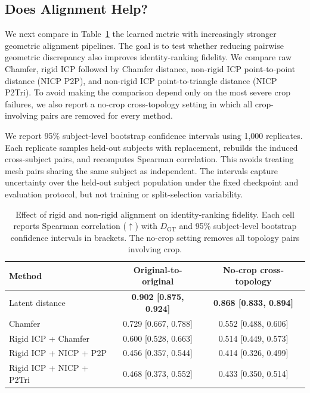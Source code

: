 \documentclass{article}
\begin{document}
\subsection{Does Alignment Help?}
\label{sec:alignment_results}

We next compare in Table~\ref{tab:alignment_effect} the learned metric with increasingly stronger geometric alignment pipelines. The goal is to test whether reducing pairwise geometric discrepancy also improves identity-ranking fidelity. We compare raw Chamfer, rigid ICP followed by Chamfer distance, non-rigid ICP point-to-point distance (NICP P2P), and non-rigid ICP point-to-triangle distance (NICP P2Tri). To avoid making the comparison depend only on the most severe crop failures, we also report a no-crop cross-topology setting in which all crop-involving pairs are removed for every method.

We report 95\% subject-level bootstrap confidence intervals using 1,000
replicates. Each replicate samples held-out subjects with replacement, rebuilds
the induced cross-subject pairs, and recomputes Spearman correlation. This avoids
treating mesh pairs sharing the same subject as independent. The intervals
capture uncertainty over the held-out subject population under the fixed
checkpoint and evaluation protocol, but not training or split-selection
variability.

\begin{table}[!ht]
\centering
\small
\caption{Effect of rigid and non-rigid alignment on identity-ranking fidelity.
Each cell reports Spearman correlation ($\uparrow$) with $D_{\mathrm{GT}}$ and
95\% subject-level bootstrap confidence intervals in brackets. The no-crop
setting removes all topology pairs involving crop.}
\label{tab:alignment_effect}
\begin{tabular}{lcc}
\toprule
Method & Original-to-original & No-crop cross-topology \\
\midrule
Latent distance & \textbf{0.902 [0.875, 0.924]} & \textbf{0.868 [0.833, 0.894]} \\
Chamfer & 0.729 [0.667, 0.788] & 0.552 [0.488, 0.606] \\
Rigid ICP + Chamfer & 0.600 [0.528, 0.663] & 0.514 [0.449, 0.573] \\
Rigid ICP + NICP + P2P & 0.456 [0.357, 0.544] & 0.414 [0.326, 0.499] \\
Rigid ICP + NICP + P2Tri & 0.468 [0.373, 0.552] & 0.433 [0.350, 0.514] \\
\bottomrule
\end{tabular}
\end{table}
\end{document}

